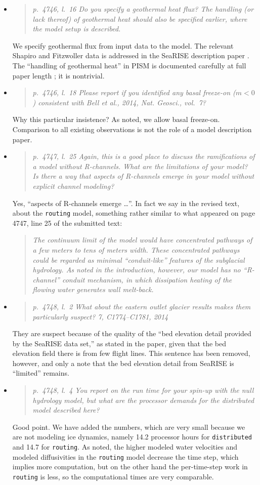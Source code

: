\documentclass[11pt,reqno]{amsart}
\newcommand{\reply}[2]{
\medskip\medskip
\item  \begin{quote}
\emph{#1}
\end{quote}

\medskip
\noindent #2}
\begin{document}
\begin{itemize}
\reply{p.~4746, l.~16 Do you specify a geothermal heat flux? The handling (or lack thereof) of geothermal heat should also be specified earlier, where the model setup is described.}
{We specify geothermal flux from input data to the model.  The relevant Shapiro and Fitzwoller data is addressed in the SeaRISE description paper \cite{Bindschadler2013SeaRISE}.  The ``handling of geothermal heat'' in PISM is documented carefully at full paper length \cite{AschwandenBuelerKhroulevBlatter}; it is nontrivial.}

\reply{p.~4746, l.~18 Please report if you identified any basal freeze-on ($m < 0$) consistent with Bell et al., 2014, Nat. Geosci., vol.~7?}
{Why this particular insistence?  As noted, we allow basal freeze-on.  Comparison to all existing observations is not the role of a model description paper.}

\reply{p.~4747, l.~25 Again, this is a good place to discuss the ramifications of a model without R-channels. What are the limitations of your model? Is there a way that aspects of R-channels emerge in your model without explicit channel modeling?}
{Yes, ``aspects of R-channels emerge \dots''.  In fact we say in the revised text, about the \texttt{routing} model, something rather similar to what appeared on page 4747, line 25 of the submitted text:
\begin{quote}
\emph{The continuum limit of the model would have concentrated pathways of a few meters to tens of meters width.  These concentrated pathways could be regarded as minimal ``conduit-like'' features of the subglacial hydrology.  As noted in the introduction, however, our model has no ``R-channel'' conduit mechanism, in which dissipation heating of the flowing water generates wall melt-back.}
\end{quote}}

\reply{p.~4748, l.~2 What about the eastern outlet glacier results makes them particularly
suspect? 7, C1774--C1781, 2014}
{They are suspect because of the quality of the ``bed elevation detail provided by the SeaRISE data set,'' as stated in the paper, given that the bed elevation field there is from few flight lines.  This sentence has been removed, however, and only a note that the bed elevation detail from SeaRISE is ``limited'' remains.}

\reply{p.~4748, l.~4 You report on the run time for your spin-up with the null hydrology model, but what are the processor demands for the distributed model described here?}
{Good point.  We have added the numbers, which are very small because we are not modeling ice dynamics, namely 14.2 processor hours for \texttt{distributed} and 14.7 for \texttt{routing}.  As noted, the higher modeled water velocities and modeled diffusivities in the \texttt{routing} model decrease the time step, which implies more computation, but on the other hand the per-time-step work in \texttt{routing} is less, so the computational times are very comparable.}


\end{itemize}
\end{document}

